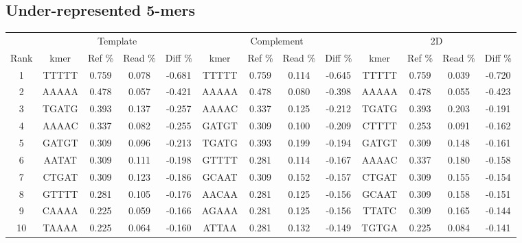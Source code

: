 \documentclass[a4paper,11pt,oneside]{article}
\begin{document}
\subsection*{Under-represented 5-mers}
\vspace{-3mm}
\begin{table}[H]
{\footnotesize
\fontsize{7pt}{9pt}\selectfont
\begin{tabular}{|c|c c c c|c c c c|c c c c|}
\cline{1-13}
 & \multicolumn{4}{c|}{Template} & \multicolumn{4}{c|}{Complement} & \multicolumn{4}{c|}{2D} \\
Rank & kmer & Ref \% & Read \% & Diff \% & kmer & Ref \% & Read \% & Diff \% & kmer & Ref \% & Read \% & Diff \% \\
\cline{1-13}
1 & TTTTT & 0.759 & 0.078 & -0.681 & TTTTT & 0.759 & 0.114 & -0.645 & TTTTT & 0.759 & 0.039 & -0.720 \\
2 & AAAAA & 0.478 & 0.057 & -0.421 & AAAAA & 0.478 & 0.080 & -0.398 & AAAAA & 0.478 & 0.055 & -0.423 \\
3 & TGATG & 0.393 & 0.137 & -0.257 & AAAAC & 0.337 & 0.125 & -0.212 & TGATG & 0.393 & 0.203 & -0.191 \\
4 & AAAAC & 0.337 & 0.082 & -0.255 & GATGT & 0.309 & 0.100 & -0.209 & CTTTT & 0.253 & 0.091 & -0.162 \\
5 & GATGT & 0.309 & 0.096 & -0.213 & TGATG & 0.393 & 0.199 & -0.194 & GATGT & 0.309 & 0.148 & -0.161 \\
6 & AATAT & 0.309 & 0.111 & -0.198 & GTTTT & 0.281 & 0.114 & -0.167 & AAAAC & 0.337 & 0.180 & -0.158 \\
7 & CTGAT & 0.309 & 0.123 & -0.186 & GCAAT & 0.309 & 0.152 & -0.157 & CTGAT & 0.309 & 0.155 & -0.154 \\
8 & GTTTT & 0.281 & 0.105 & -0.176 & AACAA & 0.281 & 0.125 & -0.156 & GCAAT & 0.309 & 0.158 & -0.151 \\
9 & CAAAA & 0.225 & 0.059 & -0.166 & AGAAA & 0.281 & 0.125 & -0.156 & TTATC & 0.309 & 0.165 & -0.144 \\
10 & TAAAA & 0.225 & 0.064 & -0.160 & ATTAA & 0.281 & 0.132 & -0.149 & TGTGA & 0.225 & 0.084 & -0.141 \\
\cline{1-13}
\end{tabular}
}
\end{table}
\vspace{-3mm}
\end{document}
